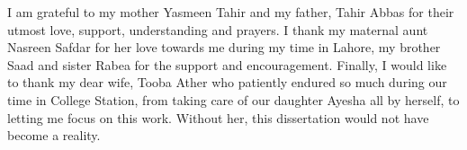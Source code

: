 I am grateful to my mother Yasmeen Tahir and my father, Tahir Abbas for their utmost love, support, understanding and prayers. I thank my maternal aunt Nasreen Safdar for her love towards me during my time in Lahore, my brother Saad and sister Rabea for the support and encouragement. Finally, I would like to thank my dear wife, Tooba Ather who patiently endured so much during our time in College Station, from taking care of our daughter Ayesha all by herself, to letting me focus on this work. Without her, this dissertation would not have become a reality.

\pagebreak{}
